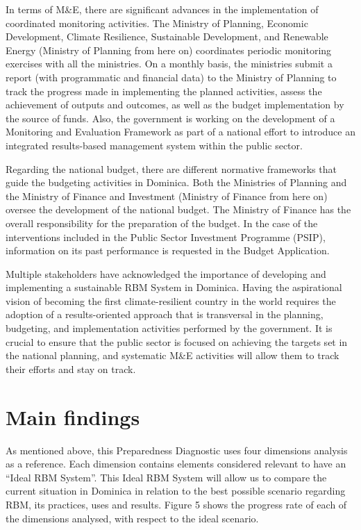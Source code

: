 \documentclass[
]{book}
\begin{document}
In terms of M\&E, there are significant advances in the implementation of coordinated monitoring activities. The Ministry of Planning, Economic Development, Climate Resilience, Sustainable Development, and Renewable Energy (Ministry of Planning from here on) coordinates periodic monitoring exercises with all the ministries. On a monthly basis, the ministries submit a report (with programmatic and financial data) to the Ministry of Planning to track the progress made in implementing the planned activities, assess the achievement of outputs and outcomes, as well as the budget implementation by the source of funds. Also, the government is working on the development of a Monitoring and Evaluation Framework as part of a national effort to introduce an integrated results-based management system within the public sector.

Regarding the national budget, there are different normative frameworks that guide the budgeting activities in Dominica. Both the Ministries of Planning and the Ministry of Finance and Investment (Ministry of Finance from here on) oversee the development of the national budget. The Ministry of Finance has the overall responsibility for the preparation of the budget. In the case of the interventions included in the Public Sector Investment Programme (PSIP), information on its past performance is requested in the Budget Application.

Multiple stakeholders have acknowledged the importance of developing and implementing a sustainable RBM System in Dominica. Having the aspirational vision of becoming the first climate-resilient country in the world requires the adoption of a results-oriented approach that is transversal in the planning, budgeting, and implementation activities performed by the government. It is crucial to ensure that the public sector is focused on achieving the targets set in the national planning, and systematic M\&E activities will allow them to track their efforts and stay on track.

\hypertarget{section5}{%
\chapter{Main findings}\label{section5}}

As mentioned above, this Preparedness Diagnostic uses four dimensions analysis as a reference. Each dimension contains elements considered relevant to have an ``Ideal RBM System''. This Ideal RBM System will allow us to compare the current situation in Dominica in relation to the best possible scenario regarding RBM, its practices, uses and results. Figure 5 shows the progress rate of each of the dimensions analysed, with respect to the ideal scenario.
\end{document}
